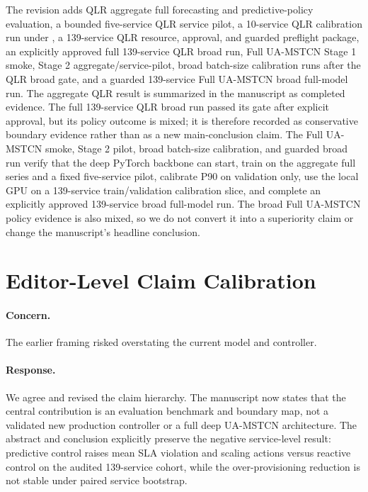 \documentclass[11pt]{article}
\newcommand{\code}[1]{\texttt{\detokenize{#1}}}
\begin{document}
The revision adds QLR aggregate full forecasting and predictive-policy evaluation, a bounded five-service QLR service pilot, a 10-service QLR calibration run under \code{--num-workers 2}, a 139-service QLR resource, approval, and guarded preflight package, an explicitly approved full 139-service QLR broad run, Full UA-MSTCN Stage 1 smoke, Stage 2 aggregate/service-pilot, broad batch-size calibration runs after the QLR broad gate, and a guarded 139-service Full UA-MSTCN broad full-model run. The aggregate QLR result is summarized in the manuscript as completed evidence. The full 139-service QLR broad run passed its gate after explicit approval, but its policy outcome is mixed; it is therefore recorded as conservative boundary evidence rather than as a new main-conclusion claim. The Full UA-MSTCN smoke, Stage 2 pilot, broad batch-size calibration, and guarded broad run verify that the deep PyTorch backbone can start, train on the aggregate full series and a fixed five-service pilot, calibrate P90 on validation only, use the local GPU on a 139-service train/validation calibration slice, and complete an explicitly approved 139-service broad full-model run. The broad Full UA-MSTCN policy evidence is also mixed, so we do not convert it into a superiority claim or change the manuscript's headline conclusion.

\section*{Editor-Level Claim Calibration}

\paragraph{Concern.} The earlier framing risked overstating the current model and controller.

\paragraph{Response.} We agree and revised the claim hierarchy. The manuscript now states that the central contribution is an evaluation benchmark and boundary map, not a validated new production controller or a full deep UA-MSTCN architecture. The abstract and conclusion explicitly preserve the negative service-level result: predictive control raises mean SLA violation and scaling actions versus reactive control on the audited 139-service cohort, while the over-provisioning reduction is not stable under paired service bootstrap.
\end{document}
